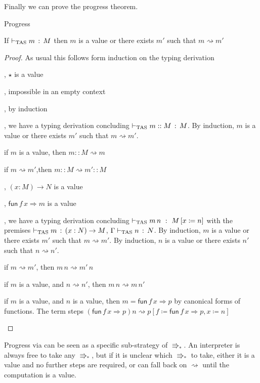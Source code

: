  
Finally we can prove the progress theorem.
\begin{thm}
Progress
 
If $\vdash_{\mathrm{TAS}} m\,:\,M$ then $m$ is a value or there exists $m'$ such that $m\rightsquigarrow m'$
\end{thm}
 
\begin{proof}
As usual this follows form induction on the typing derivation
 
\begin{casenv}
 \item {}, $\star$ is a value
 \item {}, impossible in an empty context
 \item {}, by induction
 \item {}, we have a typing derivation concluding $\vdash_{\mathrm{TAS}} m::M\,:\,M$.
 By induction, $m$ is a value or there exists $m'$ such that $m\rightsquigarrow m'$.
 \begin{casenv}
   \item if $m$ is a value, then $m::M\rightsquigarrow m$
   \item if $m\rightsquigarrow m'$,then $m::M\rightsquigarrow m'::M$
 \end{casenv}
 \item {}, $\left(x:M\right)\rightarrow N$ is a value
 \item {}, $\mathsf{fun}\,f\,x\Rightarrow m$ is a value
 \item {}, we have a typing derivation concluding $\vdash_{\mathrm{TAS}} m\,n\ :\ M\left[x\coloneqq n\right]$ with the premises $\vdash_{\mathrm{TAS}} m\,:\,\left(x:N\right)\rightarrow M$, $\Gamma\vdash_{\mathrm{TAS}} n\,:\,N$.
 By induction, $m$ is a value or there exists $m'$ such that $m\rightsquigarrow m'$.
 By induction, $n$ is a value or there exists $n'$ such that $n\rightsquigarrow n'$.
 \begin{casenv}
   \item if $m\rightsquigarrow m'$, then $m\,n\rightsquigarrow m'\,n$
   \item if $m$ is a value, and $n\rightsquigarrow n'$,  then $m\,n\rightsquigarrow m\,n'$
   \item if $m$ is a value, and $n$ is a value, then $m=\mathsf{fun}\,f\,x\Rightarrow p$ by canonical forms of functions.
     The term steps $\left(\mathsf{fun}\,f\,x\Rightarrow p\right)n\rightsquigarrow p\left[f\coloneqq\mathsf{fun}\,f\,x\Rightarrow p,x\coloneqq n\right]$
 \end{casenv}
\end{casenv}
 
\end{proof}
Progress via \cbv{} can be seen as a specific sub-strategy of $\Rrightarrow_*$.
An interpreter is always free to take any $\Rrightarrow_*$, but if it is unclear which $\Rrightarrow_*$ to take, either it is a value and no further steps are required, or can fall back on $\rightsquigarrow$ until the computation is a value.

